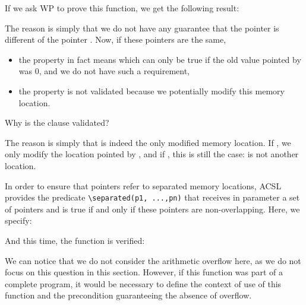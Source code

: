 


If we ask WP to prove this function, we get the following result:





The reason is simply that we do not have any guarantee that the pointer
 is different of the pointer . Now, if these
pointers are the same,



\begin{itemize}
\item   the property  in fact
  means  which can only
  be true if the old value pointed by  was $0$, and we do
  not have such a requirement,
\item
  the property  is not validated
  because we potentially modify this memory location.
\end{itemize}


\begin{Question}
  Why is the  clause validated?

  The reason is simply that  is indeed the only modified memory
  location. If , we only modify the location pointed by
  , and if , this is still the case:
   is not another location.
\end{Question}


In order to ensure that pointers refer to separated memory locations,
ACSL provides the predicate
\texttt{\textbackslash{}separated(p1,\ ...,pn)} that receives in
parameter a set of pointers and is true if and only if these pointers are
non-overlapping. Here, we specify:






And this time, the function is verified:





We can notice that we do not consider the arithmetic overflow here, as
we do not focus on this question in this section. However, if this
function was part of a complete program, it would be necessary to define
the context of use of this function and the precondition guaranteeing
the absence of overflow.


